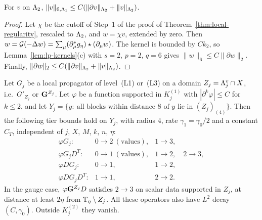 \begin{lemma}\label{lem:local-sobolev}
For $v$ on $\Lambda_2$, $\|v\|_{6,\Lambda_1}\le C(\|\partial v\|_{\Lambda_2}+\|v\|_{\Lambda_2})$.
\end{lemma}

\begin{proof}
Let $\chi$ be the cutoff of Step~1 of the proof of Theorem~\ref{thm:local-regularity}, rescaled to $\Lambda_2$, and $w=\chi v$, extended by zero. Then $w=\mathcal G(-\Delta w)=\sum_\mu(\partial^*_\mu g_\eta)\star(\partial_\mu w)$. The kernel is bounded by $Ck_{2}$, so Lemma~\ref{lem:lp-kernels}(c) with $s=2$, $p=2$, $q=6$ gives $\|w\|_6\le C\|\partial w\|_2$. Finally, $\|\partial w\|_2\le C(\|\partial v\|_{\Lambda_2}+\|v\|_{\Lambda_2})$.
\end{proof}

\begin{lemma}\label{lem:int-factors}
Let $G_j$ be a local propagator of level~(L1) or~(L3) on a domain $Z_j=\Lambda^v_j\cap X$, i.e.\ $G'_{Z_j}$ or $\mathbf G^{Z_j}$. Let $\varphi$ be a function supported in $K_j^{(1)}$ with $|\partial^k\varphi|\le C$ for $k\le2$, and let $Y_j=\{y:\ \text{all blocks within distance }8\text{ of }y\text{ lie in }(Z_j)_{(4)}\}$. Then the following tier bounds hold on $Y_j$, with radius $4$, rate $\gamma_1=\gamma_0/2$ and a constant $C_T$, independent of $j$, $X$, $M$, $k$, $n$, $\eta$:
\[
\begin{array}{lll}
\varphi G_j: & 0\to2\ (\text{values}), & 1\to3,\\
\varphi G_jD^T: & 0\to1\ (\text{values}), & 1\to2,\quad 2\to3,\\
\varphi DG_j: & 0\to1, & 1\to2,\\
\varphi DG_jD^T: & 1\to1, & 2\to2.
\end{array}
\]
In the gauge case, $\varphi\mathbf G^{Z_j}D$ satisfies $2\to3$ on scalar data supported in $Z_j$, at distance at least $2\eta$ from $\mathbb T_\eta\setminus Z_j$. All these operators also have $L^2$ decay $(C,\gamma_0)$. Outside $K_j^{(2)}$ they vanish.
\end{lemma}

